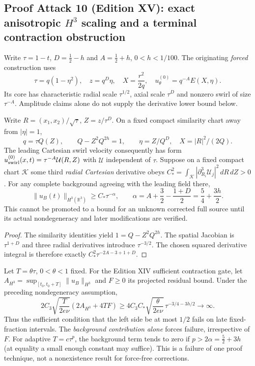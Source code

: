 \subsection*{Proof Attack 10 (Edition XV): exact anisotropic $H^3$ scaling and a terminal contraction obstruction}
\label{subsec:XV-anisotropic-H3}
Write $\tau=1-t$, $D=\tfrac12-h$ and $A=\tfrac12+h$, $0<h<1/100$. The originating \emph{forced} construction uses
\[
\tau=q(1-\eta^2),\quad z=q^D\eta,\quad X=\frac{r^2}{2q},
\quad u_\theta^{(0)}=q^{-A}E(X,\eta).
\]
Its core has characteristic radial scale $\tau^{1/2}$, axial scale $\tau^D$ and nonzero swirl of size $\tau^{-A}$. Amplitude claims alone do not supply the derivative lower bound below.

\begin{proposition}
Write $R=(x_1,x_2)/\sqrt{\tau}$, $Z=z/\tau^D$. On a fixed compact similarity chart away from $|\eta|=1$,
\[
q=\tau Q(Z),\qquad Q-Z^2Q^{2h}=1,\qquad
\eta=Z/Q^D,\quad X=|R|^2/(2Q).
\]
The leading Cartesian swirl velocity consequently has form
$u_{\rm swirl}^{(0)}(x,t)=\tau^{-A}\mathcal U(R,Z)$ with $\mathcal U$ independent of $\tau$.
Suppose on a fixed compact chart $\mathcal K$ some third \emph{radial Cartesian} derivative obeys
$C_*^2=\int_{\mathcal K}|\partial_{R_i}^3\mathcal U_j|^2\,dR\,dZ>0$.
For any complete background agreeing with the leading field there,
\begin{equation}\label{eq:XV-aniso-H3}
\boxed{\|u_B(t)\|_{H^3(\mathbb R^3)}\ge C_*\tau^{-\alpha},
\qquad \alpha=A+\frac32-\frac{1+D}{2}
=\frac54+\frac{3h}{2}.}
\end{equation}
This cannot be promoted to a bound for an unknown corrected full source until its actual nondegeneracy and later modifications are verified.
\end{proposition}
\begin{proof}
The similarity identities yield $1=Q-Z^2Q^{2h}$. The spatial Jacobian is $\tau^{1+D}$ and three radial derivatives introduce $\tau^{-3/2}$. The chosen squared derivative integral is therefore exactly
$C_*^2\tau^{-2A-3+1+D}$.
\end{proof}

\begin{proposition}
Let $T=\theta\tau$, $0<\theta<1$ fixed. For the Edition XIV sufficient contraction gate, let
$A_{H^3}=\sup_{[t_0,t_0+T]}\|u_B\|_{H^3}$ and $F\ge0$ its projected residual bound. Under the preceding nondegeneracy assumption,
\[
2C_3\sqrt{\frac{T}{2e\nu}}(2A_{H^3}+4TF)
\ge4C_3C_*\sqrt{\frac{\theta}{2e\nu}}\,
\tau^{-3/4-3h/2}\longrightarrow\infty.
\]
Thus the sufficient condition that the left side be at most $1/2$ fails on late fixed-fraction intervals. The \emph{background contribution alone} forces failure, irrespective of $F$.
For adaptive $T=c\tau^p$, the background term tends to zero if $p>2\alpha=\frac52+3h$ (at equality a small enough constant may suffice). This is a failure of one proof technique, not a nonexistence result for force-free corrections.
\end{proposition}

